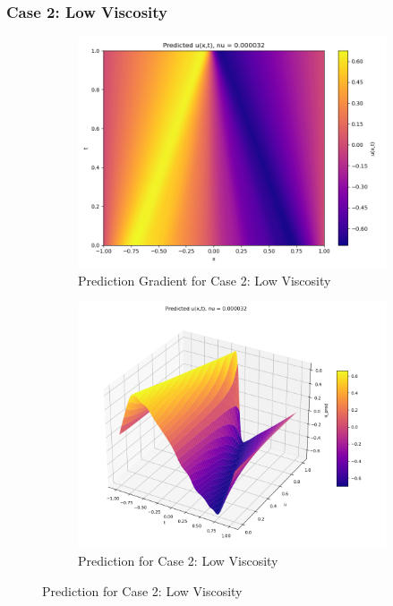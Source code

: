 \documentclass[11pt]{article}
\begin{document}
\subsubsection{Case 2: Low Viscosity}
\begin{figure}[h!]
    \centering
    \begin{subfigure}[b]{0.48\textwidth}
        \includegraphics[width=\textwidth]{1D_PredGrad_NU2_Annealing.png}
        \caption{Prediction Gradient for Case 2: Low Viscosity}
        \label{fig:PredGrad_NU2_LR}
    \end{subfigure}
    \hfill
    \begin{subfigure}[b]{0.48\textwidth}
        \includegraphics[width=\textwidth]{1D_Pred_NU2_Annealing.png}
        \caption{Prediction for Case 2: Low Viscosity}
        \label{fig:Pred_NU2_LR}
    \end{subfigure}
    \caption{Prediction for Case 2: Low Viscosity}
    \label{fig:PredTotal_NU2_LR}
\end{figure}
\end{document}
